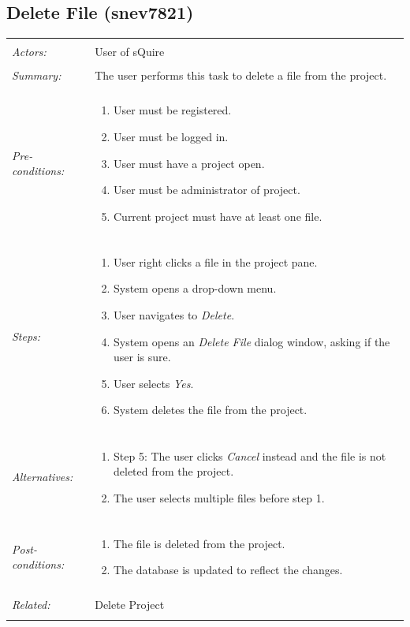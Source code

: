 \documentclass[11pt]{report}
\begin{document}
\subsection{Delete File (snev7821)}
\begin{tabular}{ p{2cm} p{12cm} }
\hline \\
	\textit{Actors:} & User of sQuire \\
	\\
	\textit{Summary:} & The user performs this task to delete a file from the project. \\
	\\
	\textit{Pre-conditions:} & \begin{enumerate}
		\item User must be registered.
		\item User must be logged in.
		\item User must have a project open.
		\item User must be administrator of project.
		\item Current project must have at least one file.
	\end{enumerate} \\
	\\
	\textit{Steps:} & \begin{enumerate}
		\item User right clicks a file in the project pane.
		\item System opens a drop-down menu.
		\item User navigates to \textit{Delete}.
		\item System opens an \textit{Delete File} dialog window, asking if the user is sure.
		\item User selects \textit{Yes}.
		\item System deletes the file from the project.
	\end{enumerate} \\
	\\
	\textit{Alternatives:} & \begin{enumerate}
		\item Step 5: The user clicks \textit{Cancel} instead and the file is not deleted from the project.
		\item The user selects multiple files before step 1.
	\end{enumerate} \\
	\\
	\textit{Post-conditions:} & \begin{enumerate}
		\item The file is deleted from the project.
		\item The database is updated to reflect the changes.
	\end{enumerate} \\
	\\
	\textit{Related:} & Delete Project \\
	\\
\hline
\end{tabular} 
\newpage
\end{document}
